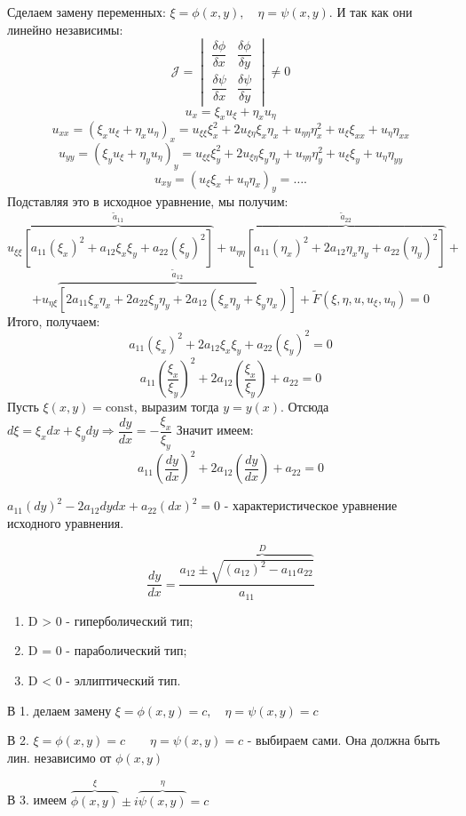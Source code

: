 Сделаем замену переменных: $ \xi = \phi (x, y), \quad \eta = \psi (x, y) $. И так как они линейно независимы:
$$ \mathcal{J} = \begin{vmatrix}
        \dfrac{\delta \phi}{\delta x} & \dfrac{\delta \phi}{\delta y} \\
        \dfrac{\delta \psi}{\delta x} & \dfrac{\delta \psi}{\delta y}
    \end{vmatrix} \neq 0 $$
$$ u_x = \xi_x u_\xi + \eta_x u_\eta $$
$$ u_{xx} = (\xi_x u_\xi + \eta_x u_\eta)_x = u_{\xi \xi} \xi^2_x + 2u_{\xi \eta} \xi_x \eta_x + u_{\eta \eta} \eta^2_x + u_\xi \xi_{xx} + u_\eta \eta_{xx} $$
$$ u_{yy} = (\xi_y u_\xi + \eta_y u_\eta)_y = u_{\xi \xi} \xi^2_y + 2u_{\xi \eta} \xi_y \eta_y + u_{\eta \eta} \eta^2_y + u_\xi \xi_{y} + u_\eta \eta_{yy} $$
$$ u_{xy} = (u_\xi \xi_x + u_\eta \eta_x)_y = \ldots. $$
Подставляя это в исходное уравнение, мы получим:
$$ u_{\xi \xi} \overbrace{[a_{11}(\xi_x)^2 + a_{12} \xi_x \xi_y + a_{22} (\xi_y)^2]}^{\tilde{a}_{11}} + u_{\eta \eta} \overbrace{[a_{11} (\eta_x)^2 + 2 a_{12} \eta_x \eta_y + a_{22} (\eta_y)^2]}^{\tilde{a}_{22}} + $$
$$ + u_{\eta \xi} \overbrace{[2 a_{11} \xi_x \eta_x + 2 a_{22} \xi_y \eta_y + 2a_{12} ( \xi_x \eta_y + \xi_y \eta_x )]}^{\tilde{a}_{12}} + \tilde{F} (\xi, \eta, u, u_\xi, u_\eta) = 0 $$
Итого, получаем:
$$ a_{11} (\xi_x)^2 + 2 a_{12} \xi_x \xi_y + a_{22} (\xi_y)^2 = 0 $$
$$ a_{11} \left(\dfrac{\xi_x}{\xi_y}\right)^2 + 2 a_{12} \left(\dfrac{\xi_x}{\xi_y}\right) + a_{22} = 0 $$
Пусть $ \xi(x, y) = \text{const} $, выразим тогда $ y = y(x) $. Отсюда $ d\xi = \xi_x dx + \xi_y dy \Rightarrow \dfrac{dy}{dx} = -\dfrac{\xi_x}{\xi_y} $
Значит имеем:
$$ a_{11} \left(\dfrac{dy}{dx}\right)^2 + 2a_{12} \left(\dfrac{dy}{dx}\right) + a_{22} = 0 $$
\begin{definition}
    $a_{11} (dy)^2 - 2 a_{12} dy dx + a_{22} (dx)^2 = 0$ - характеристическое уравнение исходного уравнения. 
\end{definition}
$$ \dfrac{dy}{dx} = \dfrac{a_{12} \pm \overbrace{\sqrt{(a_{12})^2 - a_{11} a_{22}}}^{D}}{a_{11}} $$
\begin{enumerate}
    \item D > 0 - гиперболический тип;
    \item D = 0 - параболический тип;
    \item D < 0 - эллиптический тип.
\end{enumerate}
В 1. делаем замену $ \xi = \phi (x, y) = c, \quad \eta = \psi (x, y) = c $ \par
В 2. $\xi = \phi (x, y) = c \quad \quad \eta = \psi (x, y) = c$ - выбираем сами. Она должна быть лин. независимо от $\phi (x, y)$ \par
В 3. имеем $ \overbrace{\phi (x, y)}^{\xi} \pm i \overbrace{\psi (x, y)}^{\eta} = c $

